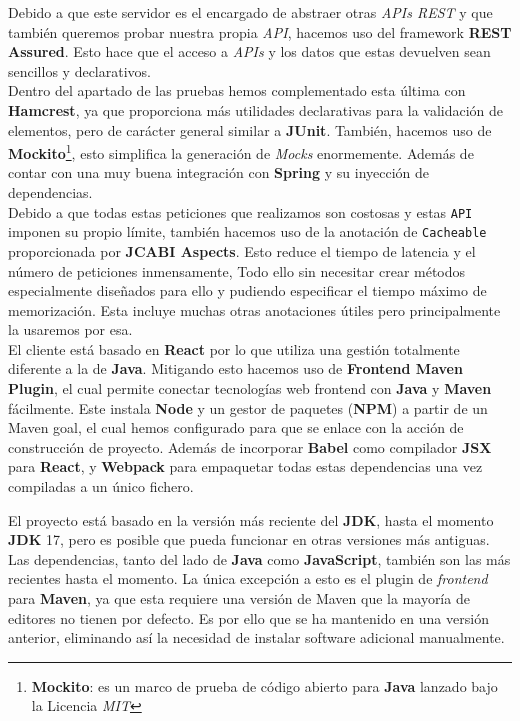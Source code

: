 \documentclass[../ei103948-project-documentation.tex]{subfiles}
\begin{document}
				Debido a que este servidor es el encargado de abstraer otras \textit{APIs REST} y que también queremos probar nuestra propia \textit{API}, hacemos uso del framework \textbf{REST Assured}. Esto hace que el acceso a \textit{APIs} y los datos que estas devuelven sean sencillos y declarativos.\\

				Dentro del apartado de las pruebas hemos complementado esta última con \textbf{Hamcrest}, ya que proporciona más utilidades declarativas para la validación de elementos, pero de carácter general similar a \textbf{JUnit}. También, hacemos uso de \textbf{Mockito}\cite{mockito2}\footnote{\textbf{Mockito}: es un marco de prueba de código abierto para \textbf{Java} lanzado bajo la Licencia \textit{MIT}}, esto simplifica la generación de \textit{Mocks} enormemente. Además de contar con una muy buena integración con \textbf{Spring} y su inyección de dependencias.\\

				Debido a que todas estas peticiones que realizamos son costosas y estas \texttt{API} imponen su propio límite, también hacemos uso de la anotación de \texttt{Cacheable} proporcionada por \textbf{JCABI Aspects}. Esto reduce el tiempo de latencia y el número de peticiones inmensamente, Todo ello sin necesitar crear métodos especialmente diseñados para ello y pudiendo especificar el tiempo máximo de memorización. Esta incluye muchas otras anotaciones útiles pero principalmente la usaremos por esa.\\			

				El cliente está basado en \textbf{React} por lo que utiliza una gestión totalmente diferente a la de \textbf{Java}. Mitigando esto hacemos uso de \textbf{Frontend Maven Plugin}, el cual permite conectar tecnologías web frontend con \textbf{Java} y \textbf{Maven} fácilmente. Este instala \textbf{Node} y un gestor de paquetes (\textbf{NPM}) a partir de un Maven goal, el cual hemos configurado para que se enlace con la acción de construcción de proyecto. Además de incorporar \textbf{Babel} como compilador \textbf{JSX} para \textbf{React}, y \textbf{Webpack} para empaquetar todas estas dependencias una vez compiladas a un único fichero.

                El proyecto está basado en la versión más reciente del \textbf{JDK}, hasta el momento \textbf{JDK} 17, pero es posible que pueda funcionar en otras versiones más antiguas. Las dependencias, tanto del lado de \textbf{Java} como \textbf{JavaScript}, también son las más recientes hasta el momento. La única excepción a esto es el plugin de \textit{frontend} para \textbf{Maven}, ya que esta requiere una versión de Maven que la mayoría de editores no tienen por defecto. Es por ello que se ha mantenido en una versión anterior, eliminando así la necesidad de instalar software adicional manualmente.
\end{document}
